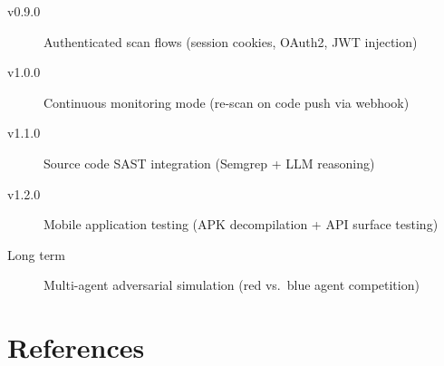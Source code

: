 \documentclass[12pt,a4paper]{article}
\begin{document}
\begin{description}
  \item[v0.9.0] Authenticated scan flows (session cookies, OAuth2, JWT injection)
  \item[v1.0.0] Continuous monitoring mode (re-scan on code push via webhook)
  \item[v1.1.0] Source code SAST integration (Semgrep + LLM reasoning)
  \item[v1.2.0] Mobile application testing (APK decompilation + API surface testing)
  \item[Long term] Multi-agent adversarial simulation (red vs.\ blue agent competition)
\end{description}



\section*{References}
\label{sec:references}
\end{document}
